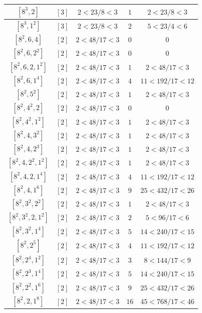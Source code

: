 \documentclass{article}%
\begin{document}
\begin{center}
\begin{longtable}{||c|c|c|c|c||}
$[8^{3}, 2]$ & $[3]$ & $2 < 23/8 < 3$ & $1$ & $2 < 23/8 < 3$ \\ \hline 
$[8^{3}, 1^{2}]$ & $[3]$ & $2 < 23/8 < 3$ & $2$ & $5 < 23/4 < 6$ \\ \hline 
$[8^{2}, 6, 4]$ & $[2]$ & $2 < 48/17 < 3$ & $0$ & $0$ \\ \hline 
$[8^{2}, 6, 2^{2}]$ & $[2]$ & $2 < 48/17 < 3$ & $0$ & $0$ \\ \hline 
$[8^{2}, 6, 2, 1^{2}]$ & $[2]$ & $2 < 48/17 < 3$ & $1$ & $2 < 48/17 < 3$ \\ \hline 
$[8^{2}, 6, 1^{4}]$ & $[2]$ & $2 < 48/17 < 3$ & $4$ & $11 < 192/17 < 12$ \\ \hline 
$[8^{2}, 5^{2}]$ & $[2]$ & $2 < 48/17 < 3$ & $1$ & $2 < 48/17 < 3$ \\ \hline 
$[8^{2}, 4^{2}, 2]$ & $[2]$ & $2 < 48/17 < 3$ & $0$ & $0$ \\ \hline 
$[8^{2}, 4^{2}, 1^{2}]$ & $[2]$ & $2 < 48/17 < 3$ & $1$ & $2 < 48/17 < 3$ \\ \hline 
$[8^{2}, 4, 3^{2}]$ & $[2]$ & $2 < 48/17 < 3$ & $1$ & $2 < 48/17 < 3$ \\ \hline 
$[8^{2}, 4, 2^{3}]$ & $[2]$ & $2 < 48/17 < 3$ & $1$ & $2 < 48/17 < 3$ \\ \hline 
$[8^{2}, 4, 2^{2}, 1^{2}]$ & $[2]$ & $2 < 48/17 < 3$ & $1$ & $2 < 48/17 < 3$ \\ \hline 
$[8^{2}, 4, 2, 1^{4}]$ & $[2]$ & $2 < 48/17 < 3$ & $4$ & $11 < 192/17 < 12$ \\ \hline 
$[8^{2}, 4, 1^{6}]$ & $[2]$ & $2 < 48/17 < 3$ & $9$ & $25 < 432/17 < 26$ \\ \hline 
$[8^{2}, 3^{2}, 2^{2}]$ & $[2]$ & $2 < 48/17 < 3$ & $1$ & $2 < 48/17 < 3$ \\ \hline 
$[8^{2}, 3^{2}, 2, 1^{2}]$ & $[2]$ & $2 < 48/17 < 3$ & $2$ & $5 < 96/17 < 6$ \\ \hline 
$[8^{2}, 3^{2}, 1^{4}]$ & $[2]$ & $2 < 48/17 < 3$ & $5$ & $14 < 240/17 < 15$ \\ \hline 
$[8^{2}, 2^{5}]$ & $[2]$ & $2 < 48/17 < 3$ & $4$ & $11 < 192/17 < 12$ \\ \hline 
$[8^{2}, 2^{4}, 1^{2}]$ & $[2]$ & $2 < 48/17 < 3$ & $3$ & $8 < 144/17 < 9$ \\ \hline 
$[8^{2}, 2^{3}, 1^{4}]$ & $[2]$ & $2 < 48/17 < 3$ & $5$ & $14 < 240/17 < 15$ \\ \hline 
$[8^{2}, 2^{2}, 1^{6}]$ & $[2]$ & $2 < 48/17 < 3$ & $9$ & $25 < 432/17 < 26$ \\ \hline 
$[8^{2}, 2, 1^{8}]$ & $[2]$ & $2 < 48/17 < 3$ & $16$ & $45 < 768/17 < 46$ \\ \hline 

\end{longtable}
\end{center}
\end{document}
